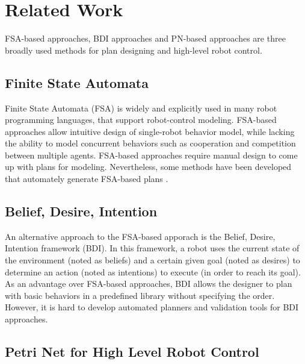 \documentclass[12pt,a4paper,twocolumn]{article}
\begin{document}
\section{Related Work}
FSA-based approaches, BDI approaches and PN-based approaches are three broadly used methods for plan designing and high-level robot control.

\subsection{Finite State Automata}

Finite State Automata (FSA) is widely and explicitly used in many robot programming languages, that support robot-control modeling. FSA-based approaches allow intuitive design of single-robot behavior model, while lacking the ability to model concurrent behaviors such as cooperation and competition between multiple agents. FSA-based approaches require manual design to come up with plans for modeling. Nevertheless, some methods have been developed that automately generate FSA-based plans \cite{kress2009temporal}.  

\subsection{Belief, Desire, Intention}

An alternative approach to the FSA-based apporach is the Belief, Desire, Intention framework (BDI). In this framework, a robot uses the current state of the environment (noted as beliefs) and a certain given goal (noted as desires) to determine an action (noted as intentions) to execute (in order to reach its goal). As an advantage over FSA-based approaches, BDI allows the designer to plan with basic behaviors in a predefined library without specifying the order. However, it is hard to develop automated planners and validation tools for BDI approaches.  

\subsection{Petri Net for High Level Robot Control}
\end{document}
